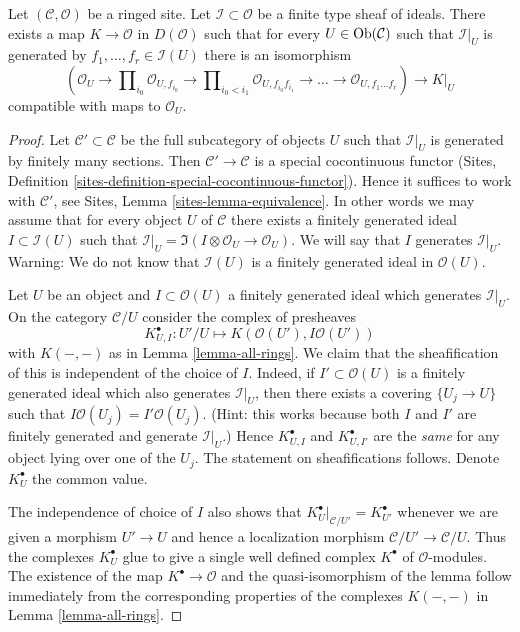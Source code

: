 \begin{lemma}
\label{lemma-global-extended-cech-complex}
Let $(\mathcal{C}, \mathcal{O})$ be a ringed site. Let
$\mathcal{I} \subset \mathcal{O}$ be a finite type sheaf of ideals.
There exists a map $K \to \mathcal{O}$ in $D(\mathcal{O})$
such that for every $U \in \mathop{\mathrm{Ob}}\nolimits(\mathcal{C})$ such that
$\mathcal{I}|_U$ is generated by $f_1, \ldots, f_r \in \mathcal{I}(U)$
there is an isomorphism
$$
(\mathcal{O}_U \to \prod\nolimits_{i_0} \mathcal{O}_{U, f_{i_0}} \to
\prod\nolimits_{i_0 < i_1} \mathcal{O}_{U, f_{i_0}f_{i_1}} \to
\ldots \to \mathcal{O}_{U, f_1\ldots f_r}) \longrightarrow K|_U
$$
compatible with maps to $\mathcal{O}_U$.
\end{lemma}

\begin{proof}
Let $\mathcal{C}' \subset \mathcal{C}$ be the full subcategory
of objects $U$ such that $\mathcal{I}|_U$ is generated by
finitely many sections. Then $\mathcal{C}' \to \mathcal{C}$
is a special cocontinuous functor
(Sites, Definition \ref{sites-definition-special-cocontinuous-functor}).
Hence it suffices to work with $\mathcal{C}'$, see
Sites, Lemma \ref{sites-lemma-equivalence}.
In other words we may assume that for every
object $U$ of $\mathcal{C}$ there exists a finitely generated
ideal $I \subset \mathcal{I}(U)$ such that
$\mathcal{I}|_U = \Im(I \otimes \mathcal{O}_U \to \mathcal{O}_U)$.
We will say that $I$ generates $\mathcal{I}|_U$.
Warning: We do not know that $\mathcal{I}(U)$ is a finitely generated
ideal in $\mathcal{O}(U)$.

\medskip\noindent
Let $U$ be an object and $I \subset \mathcal{O}(U)$ a finitely
generated ideal which generates $\mathcal{I}|_U$.
On the category $\mathcal{C}/U$ consider the complex of presheaves
$$
K_{U, I}^\bullet : U'/U \longmapsto K(\mathcal{O}(U'), I\mathcal{O}(U'))
$$
with $K(-, -)$ as in Lemma \ref{lemma-all-rings}.
We claim that the sheafification of this is independent of
the choice of $I$. Indeed, if $I' \subset \mathcal{O}(U)$
is a finitely generated ideal which also generates $\mathcal{I}|_U$, then
there exists a covering $\{U_j \to U\}$ such that
$I\mathcal{O}(U_j) = I'\mathcal{O}(U_j)$. (Hint: this works because
both $I$ and $I'$ are finitely generated and generate $\mathcal{I}|_U$.)
Hence $K_{U, I}^\bullet$ and $K_{U, I'}^\bullet$ are the {\it same}
for any object lying over one of the $U_j$. The statement
on sheafifications follows. Denote $K_U^\bullet$ the common value.

\medskip\noindent
The independence of choice of $I$ also shows that
$K_U^\bullet|_{\mathcal{C}/U'} = K_{U'}^\bullet$
whenever we are given a morphism
$U' \to U$ and hence a localization morphism
$\mathcal{C}/U' \to \mathcal{C}/U$. Thus the complexes
$K_U^\bullet$ glue to give a single well defined complex $K^\bullet$
of $\mathcal{O}$-modules. The existence of the map $K^\bullet \to \mathcal{O}$
and the quasi-isomorphism of the lemma follow immediately from
the corresponding properties of the complexes $K(-, -)$ in
Lemma \ref{lemma-all-rings}.
\end{proof}

